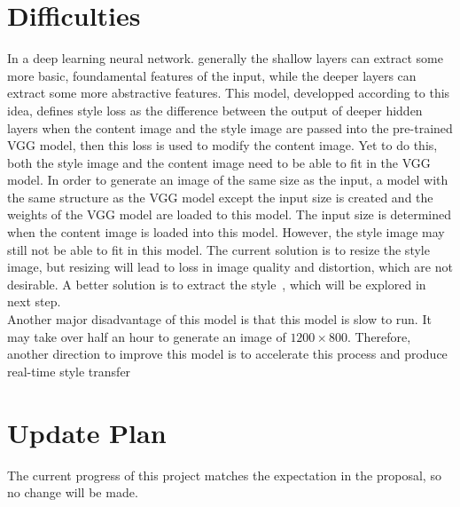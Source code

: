 \documentclass[10pt,twocolumn,letterpaper]{article}
\begin{document}
\section{Difficulties}
In a deep learning neural network. generally the shallow layers can extract some more basic, foundamental features of the input, while the deeper layers can extract some more abstractive features. This model, developped according to this idea, defines style loss as the difference between the output of deeper hidden layers when the content image and the style image are passed into the pre-trained VGG model, then this loss is used to modify the content image. Yet to do this, both the style image and the content image need to be able to fit in the VGG model. In order to generate an image of the same size as the input, a model with the same structure as the VGG model except the input size is created and the weights of the VGG model are loaded to this model. The input size is determined when the content image is loaded into this model. However, the style image may still not be able to fit in this model. The current solution is to resize the style image, but resizing will lead to loss in image quality and distortion, which are not desirable. A better solution is to extract the style~\cite{Ulyanov}, which will be explored in next step. \\
Another major disadvantage of this model is that this model is slow to run. It may take over half an hour to generate an image of $1200\times 800$. Therefore, another direction to improve this model is to accelerate this process and produce real-time style transfer~\cite{Johnson} ~\cite{Ulyanov2}

\section{Update Plan}
The current progress of this project matches the expectation in the proposal, so no change will be made. 

{\small


}
\end{document}
